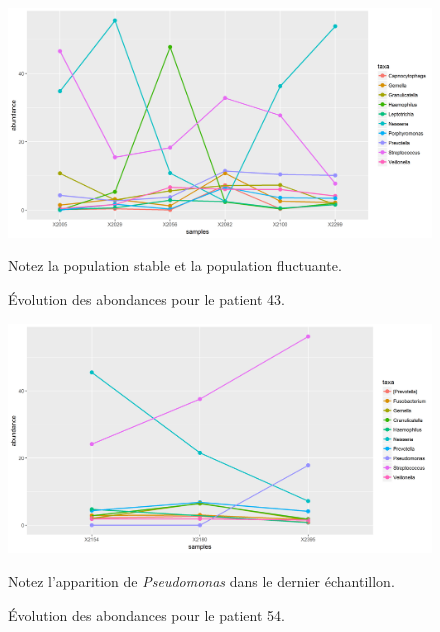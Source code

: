 \documentclass[12pt,a4paper]{article}
\begin{document}
\begin{figure}[H]
\begin{center}
\includegraphics[scale=0.60]{img/curve_043.png}\hfill
\caption{Évolution des abondances pour le patient 43.}
Notez la population stable et la population fluctuante.
\label{evolution43}
\end{center}

\end{figure}

\begin{figure}[H]
\begin{center}
\includegraphics[scale=0.60]{img/curve_054.png}\hfill
\caption{Évolution des abondances pour le patient 54.}
Notez l'apparition de \textit{Pseudomonas} dans le dernier échantillon.
\label{evolution54}
\end{center}

\end{figure}
\end{document}
